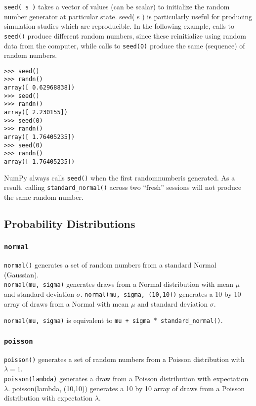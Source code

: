 \documentclass[KSmain.tex]{subfiles}
\begin{document}
\texttt{seed( s )} takes a vector of values (can be scalar) to
initialize the random number generator at particular state. seed( s ) is particularly useful for producing
simulation studies which are reproducible. In the following example, calls to \texttt{seed()} produce different
random numbers, since these reinitialize using random data from the computer, while calls to \texttt{seed(0)}
produce the same (sequence) of random numbers.
\begin{framed}
\begin{verbatim}
>>> seed()
>>> randn()
array([ 0.62968838])
>>> seed()
>>> randn()
array([ 2.230155])
>>> seed(0)
>>> randn()
array([ 1.76405235])
>>> seed(0)
>>> randn()
array([ 1.76405235])
\end{verbatim}
\end{framed}
NumPy always calls \texttt{seed()}  when the first randomnumberis generated. As a result. calling \texttt{standard\_normal()}
across two “fresh” sessions will not produce the same random number.


\newpage
\subsection{Probability Distributions}
\subsubsection{\texttt{normal}}
\texttt{normal()} generates a set of random numbers from a standard Normal (Gaussian).\\ \texttt{normal(mu, sigma)} generates draws from
a Normal distribution with mean $\mu$ and standard deviation $\sigma$. \texttt{normal(mu, sigma, (10,10))} generates a 10 by 10 array
of draws from a Normal with mean $\mu$ and standard deviation $\sigma$. 

\texttt{normal(mu, sigma)} is equivalent to \texttt{mu + sigma $\ast$ \texttt{standard\_normal()}}.
\subsubsection{\texttt{poisson}}
\texttt{poisson()} generates a set of random numbers from a Poisson distribution with $\lambda = 1$.\\ \texttt{poisson(lambda)} generates a draw
from a Poisson distribution with expectation $\lambda$. poisson(lambda, (10,10)) generates a 10 by 10 array of
draws from a Poisson distribution with expectation $\lambda$.
\end{document}
